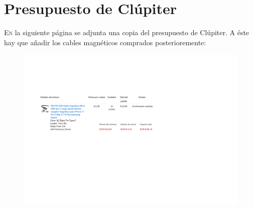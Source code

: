 \chapter{Presupuesto de Clúpiter}
\label{chap:presupuesto_clupiter}

\lettrine{E}{n} la siguiente página se adjunta una copia del presupuesto de Clúpiter. A éste hay que añadir los cables magnéticos comprados posterioremente:

\begin{figure}[H]
  \centering
  \vspace{0.5cm}
  \includegraphics[width=\textwidth,trim=18mm 98mm 113mm 57mm]{pdf_tex/presupuesto_clupiter/getihu_cable.pdf}
\end{figure}

